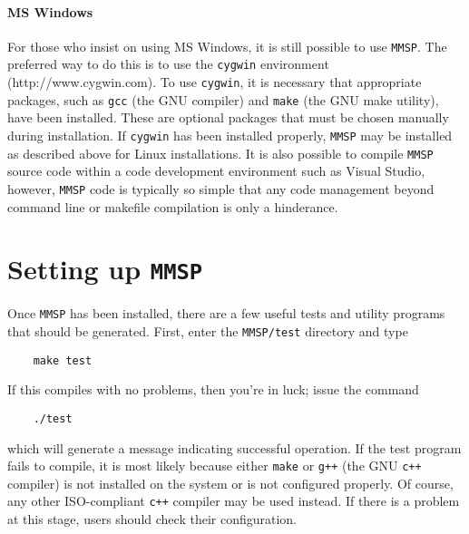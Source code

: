 \paragraph{MS Windows}
For those who insist on using MS Windows, it is still possible to use {\tt MMSP}.  The preferred way to do this is to use the {\tt cygwin} environment (http://www.cygwin.com).  To use {\tt cygwin}, it is necessary that appropriate packages, such as {\tt gcc} (the GNU compiler) and {\tt make} (the GNU make utility), have been installed.  These are optional packages that must be chosen manually during installation.  If {\tt cygwin} has been installed properly, {\tt MMSP} may be installed as described above for Linux installations.  It is also possible to compile {\tt MMSP} source code within a code development environment such as Visual Studio, however, {\tt MMSP} code is typically so simple that any code management beyond command line or makefile compilation is only a hinderance.

\section{Setting up {\tt MMSP}}
Once {\tt MMSP} has been installed, there are a few useful tests and utility programs that should be generated.  First, enter the {\tt MMSP/test} directory and type
\begin{shadebox}
\begin{verbatim}
    make test
\end{verbatim}
\end{shadebox}
If this compiles with no problems, then you're in luck; issue the command
\begin{shadebox}
\begin{verbatim}
    ./test
\end{verbatim}
\end{shadebox}
which will generate a message indicating successful operation.  If the test program fails to compile, it is most likely because either {\tt make} or {\tt g++} (the GNU {\tt c++} compiler) is not installed on the system or is not configured properly.  Of course, any other ISO-compliant {\tt c++} compiler may be used instead.  If there is a problem at this stage, users should check their configuration.

